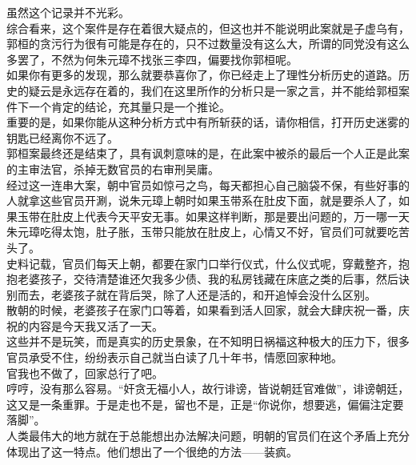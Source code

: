 \begin{multicols}{\theparacolNo}
虽然这个记录并不光彩。\\

综合看来，这个案件是存在着很大疑点的，但这也并不能说明此案就是子虚乌有，郭桓的贪污行为很有可能是存在的，只不过数量没有这么大，所谓的同党没有这么多罢了，不然为何朱元璋不找张三李四，偏要找你郭桓呢。\\

如果你有更多的发现，那么就要恭喜你了，你已经走上了理性分析历史的道路。历史的疑云是永远存在着的，我们在这里所作的分析只是一家之言，并不能给郭桓案件下一个肯定的结论，充其量只是一个推论。\\

重要的是，如果你能从这种分析方式中有所斩获的话，请你相信，打开历史迷雾的钥匙已经离你不远了。\\

郭桓案最终还是结束了，具有讽刺意味的是，在此案中被杀的最后一个人正是此案的主审法官，杀掉无数官员的右审刑吴庸。\\

经过这一连串大案，朝中官员如惊弓之鸟，每天都担心自己脑袋不保，有些好事的人就拿这些官员开涮，说朱元璋上朝时如果玉带系在肚皮下面，就是要杀人了，如果玉带在肚皮上代表今天平安无事。如果这样判断，那是要出问题的，万一哪一天朱元璋吃得太饱，肚子胀，玉带只能放在肚皮上，心情又不好，官员们可就要吃苦头了。\\

史料记载，官员们每天上朝，都要在家门口举行仪式，什么仪式呢，穿戴整齐，抱抱老婆孩子，交待清楚谁还欠我多少债、我的私房钱藏在床底之类的后事，然后诀别而去，老婆孩子就在背后哭，除了人还是活的，和开追悼会没什么区别。\\

散朝的时候，老婆孩子在家门口等着，如果看到活人回家，就会大肆庆祝一番，庆祝的内容是今天我又活了一天。\\

这些并不是玩笑，而是真实的历史景象，在不知明日祸福这种极大的压力下，很多官员承受不住，纷纷表示自己就当白读了几十年书，情愿回家种地。\\

官我也不做了，回家总行了吧。\\

哼哼，没有那么容易。“奸贪无福小人，故行诽谤，皆说朝廷官难做”，诽谤朝廷，这又是一条重罪。于是走也不是，留也不是，正是“你说你，想要逃，偏偏注定要落脚”。\\

人类最伟大的地方就在于总能想出办法解决问题，明朝的官员们在这个矛盾上充分体现出了这一特点。他们想出了一个很绝的方法——装疯。\\


\end{multicols}
